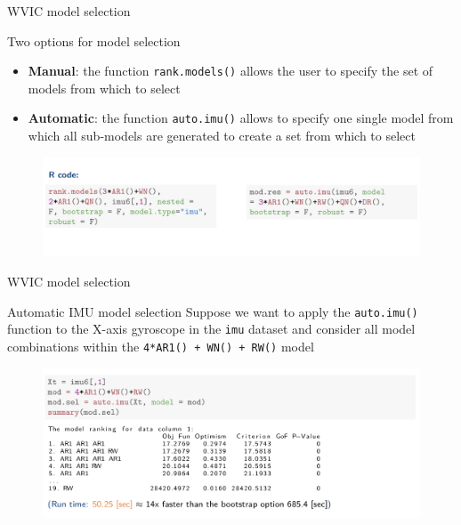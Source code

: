 \documentclass[envcountsect,usenames,dvipsnames]{beamer}
\theoremstyle{mystyle}
\begin{document}
\begin{frame}{WVIC model selection}

\begin{block}{Two options for model selection}
\begin{itemize}
    \item \textbf{Manual}: the function {\tt rank.models()} allows the user to specify the set of models from which to select 
    \item \textbf{Automatic}: the function {\tt auto.imu()} allows to specify one single model from which all sub-models are generated to create a set from which to select
\end{itemize}
\end{block}

\begin{figure}
	  \centering
	 	\includegraphics[width=1\textwidth]{Images/wvic1_code.png}
\end{figure}

\end{frame}

\begin{frame}{WVIC model selection}

\begin{block}{Automatic IMU model selection}
Suppose we want to apply the {\tt auto.imu()} function to the X-axis gyroscope in the {\tt imu} dataset and consider all model combinations within the {\tt 4*AR1() + WN() + RW()} model
\end{block}

\begin{figure}
	  \centering
	 	\includegraphics[width=1\textwidth]{Images/wvic2_code.png}
\end{figure}


\end{frame}
\end{document}
